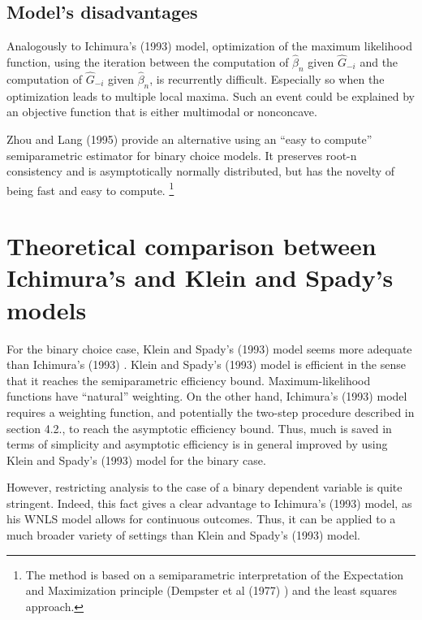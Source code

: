 \documentclass[a4paper]{article}
\begin{document}
\subsection{Model's disadvantages} %
\label{sub:Model's disadvantages}

Analogously to Ichimura's (1993) \cite{[6]} model, optimization of the maximum likelihood function, using the iteration between the computation of $\hat{\beta}_n$ given $\hat{G}_{-i}$ and the computation of $\hat{G}_{-i}$ given $\hat{\beta}_n$, is recurrently difficult.  Especially so when the optimization leads to multiple local maxima. Such an event could be explained by an objective function that is either multimodal or nonconcave. 

Zhou and Lang (1995) \cite{[26]} provide an alternative using an ``easy to compute'' semiparametric estimator for binary choice models. It preserves root-n consistency and is asymptotically normally distributed, but has the novelty of being fast and easy to compute. \footnote{The method is based on a semiparametric interpretation of the Expectation and Maximization principle (Dempster et al (1977) \cite{[27]}) and the least squares approach.}

\section{Theoretical comparison between Ichimura's and Klein and Spady's models} %
\label{sec:Theoretical comparison between Ichimura's and Klein and Spady's models}

For the binary choice case, Klein and Spady's (1993) \cite{[12]} model seems more adequate than Ichimura's (1993) \cite{[6]}. Klein and Spady's (1993) \cite{[12]} model is efficient in the sense that it reaches the semiparametric efficiency bound. Maximum-likelihood functions have ``natural'' weighting. On the other hand, Ichimura's (1993) \cite{[6]} model requires a weighting function, and potentially the two-step procedure described in section 4.2., to reach the asymptotic efficiency bound. Thus, much is saved in terms of simplicity and asymptotic efficiency is in general improved by using Klein and Spady's (1993) \cite{[12]} model for the binary case.

However, restricting analysis to the case of a binary dependent variable is quite stringent. Indeed, this fact gives a clear advantage to Ichimura's (1993) \cite{[6]} model, as his WNLS model allows for continuous outcomes. Thus, it can be applied to a much broader variety of settings than Klein and Spady's (1993) \cite{[12]}  model.
\end{document}
